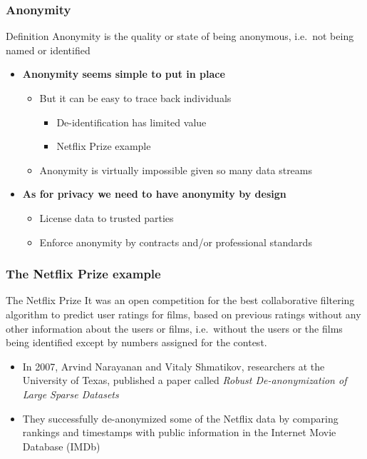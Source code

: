 \documentclass{beamer}
\begin{document}
\begin{frame}\frametitle{Anonymity}
\begin{block}{Definition}
\justifying
Anonymity is the quality or state of being anonymous, i.e.\ not being named or identified
\end{block}
\begin{itemize}
	\setlength\itemsep{1em}
	\item {\bf Anonymity seems simple to put in place}
	\begin{itemize}
		\item But it can be easy to trace back individuals
		\begin{itemize}
			\item De-identification has limited value
			\item Netflix Prize example
		\end{itemize}
		\item Anonymity is virtually impossible given so many data streams
	\end{itemize}
	\item {\bf As for privacy we need to have anonymity by design}
	\begin{itemize}
		\item License data to trusted parties
		\item Enforce anonymity by contracts and/or professional standards
	\end{itemize}
\end{itemize}
\end{frame}

\begin{frame}\frametitle{The Netflix Prize example}
\begin{block}{The Netflix Prize}
\justifying
It was an open competition for the best collaborative filtering algorithm to predict user ratings for films, based on previous ratings without any other information about the users or films, i.e.\ without the users or the films being identified except by numbers assigned for the contest.
\end{block}
\begin{itemize}
	\setlength\itemsep{1em}
	\item In 2007, Arvind Narayanan and Vitaly Shmatikov, researchers at the University of Texas, published a paper called \textit{Robust De-anonymization of Large Sparse Datasets}
	\item They successfully de-anonymized some of the Netflix data by comparing rankings and timestamps with public information in the Internet Movie Database (IMDb)
\end{itemize}
\end{frame}
\end{document}
